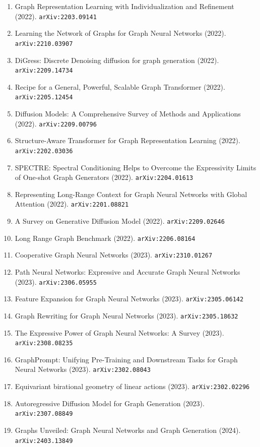 \documentclass[11pt]{article}
\begin{document}
\begin{enumerate}
  \item Graph Representation Learning with Individualization and Refinement (2022). \texttt{arXiv:2203.09141}
  \item Learning the Network of Graphs for Graph Neural Networks (2022). \texttt{arXiv:2210.03907}
  \item DiGress: Discrete Denoising diffusion for graph generation (2022). \texttt{arXiv:2209.14734}
  \item Recipe for a General, Powerful, Scalable Graph Transformer (2022). \texttt{arXiv:2205.12454}
  \item Diffusion Models: A Comprehensive Survey of Methods and Applications (2022). \texttt{arXiv:2209.00796}
  \item Structure-Aware Transformer for Graph Representation Learning (2022). \texttt{arXiv:2202.03036}
  \item SPECTRE: Spectral Conditioning Helps to Overcome the Expressivity Limits
  of One-shot Graph Generators (2022). \texttt{arXiv:2204.01613}
  \item Representing Long-Range Context for Graph Neural Networks with Global
  Attention (2022). \texttt{arXiv:2201.08821}
  \item A Survey on Generative Diffusion Model (2022). \texttt{arXiv:2209.02646}
  \item Long Range Graph Benchmark (2022). \texttt{arXiv:2206.08164}
  \item Cooperative Graph Neural Networks (2023). \texttt{arXiv:2310.01267}
  \item Path Neural Networks: Expressive and Accurate Graph Neural Networks (2023). \texttt{arXiv:2306.05955}
  \item Feature Expansion for Graph Neural Networks (2023). \texttt{arXiv:2305.06142}
  \item Graph Rewriting for Graph Neural Networks (2023). \texttt{arXiv:2305.18632}
  \item The Expressive Power of Graph Neural Networks: A Survey (2023). \texttt{arXiv:2308.08235}
  \item GraphPrompt: Unifying Pre-Training and Downstream Tasks for Graph Neural
  Networks (2023). \texttt{arXiv:2302.08043}
  \item Equivariant birational geometry of linear actions (2023). \texttt{arXiv:2302.02296}
  \item Autoregressive Diffusion Model for Graph Generation (2023). \texttt{arXiv:2307.08849}
  \item Graphs Unveiled: Graph Neural Networks and Graph Generation (2024). \texttt{arXiv:2403.13849}

\end{enumerate}
\end{document}
